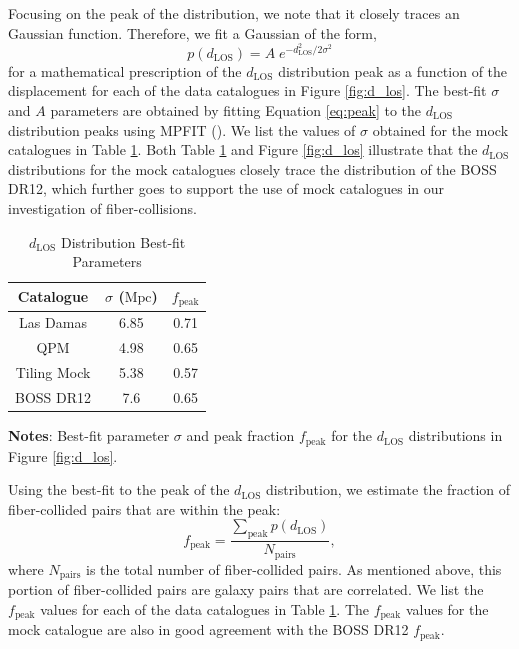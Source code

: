 \documentclass{emulateapj}
\begin{document}
Focusing on the peak of the distribution, we note that it closely traces an Gaussian function. Therefore, we fit a Gaussian of the form, 
\begin{equation} \label{eq:peak} 
p(d_{\mathrm{LOS}}) = A \; e^{-{d_{\mathrm{LOS}}^2}/{2\sigma^2}}
\end{equation}
 for a mathematical prescription of the $d_{\mathrm{LOS}}$ distribution peak as a function of the displacement for each of the data catalogues in Figure \ref{fig:d_los}. The best-fit $\sigma$ and $A$ parameters are obtained by fitting Equation \ref{eq:peak} to the $d_{\mathrm{LOS}}$ distribution peaks using MPFIT (\citealt{Markwardt:2009aa}). We list the values of $\sigma$ obtained for the mock catalogues in Table \ref{tab:mpfit}. Both Table \ref{tab:mpfit} and Figure \ref{fig:d_los} illustrate that the $d_{\mathrm{LOS}}$ distributions for the mock catalogues closely trace the distribution of the BOSS DR12, which further goes to support the use of mock catalogues in our investigation of fiber-collisions.  
 
 \begin{table} 
 \caption{$d_{\mathrm{LOS}}$ Distribution Best-fit Parameters} \label{tab:mpfit}
 \begin{spacing}{1.5}
 \begin{center}
 \leavevmode
 \begin{tabular}{ccc} \hline \hline
Catalogue &$\sigma$ ($\mathrm{Mpc}$) & $f_{\mathrm{peak}}$\\ \hline
Las Damas 	& 6.85	& 0.71 \\ 
QPM 		& 4.98	& 0.65 \\ 
Tiling Mock 	& 5.38	& 0.57 \\ 
BOSS DR12 	& 7.6		& 0.65 \\ \hline
\end{tabular} \par
\end{center}
\end{spacing}
{\bf Notes}: Best-fit parameter $\sigma$ and peak fraction $f_{\mathrm{peak}}$ for the $d_{\mathrm{LOS}}$ distributions in Figure \ref{fig:d_los}. 
\end{table}

Using the best-fit to the peak of the $d_{\mathrm{LOS}}$ distribution, we estimate the fraction of fiber-collided pairs that are within the peak: 
\begin{equation}
f_{\mathrm{peak}} = \frac{\sum\limits_{\mathrm{peak}} p(d_{\mathrm{LOS}})}{N_{\mathrm{pairs}}}, 
\end{equation}
where $N_{\mathrm{pairs}}$ is the total number of fiber-collided pairs. As mentioned above, this portion of fiber-collided pairs are galaxy pairs that are correlated. We list the $f_{\mathrm{peak}}$ values for each of the data catalogues in Table \ref{tab:mpfit}. The $f_\mathrm{peak}$ values for the mock catalogue are also in good agreement with the BOSS DR12 $f_\mathrm{peak}$. 
\end{document}
